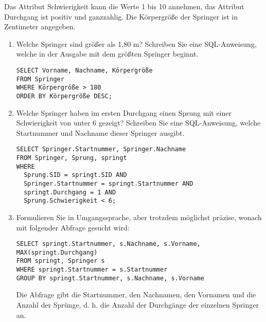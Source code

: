 \documentclass{bschlangaul-aufgabe}
\begin{document}
\noindent
Das Attribut Schwierigkeit kann die Werte 1 bis 10 annehmen, das
Attribut Durchgang ist positiv und ganzzahlig. Die Körpergröße der
Springer ist in Zentimeter angegeben.

\begin{enumerate}


\item Welche Springer sind größer als 1,80 m? Schreiben Sie eine
SQL-Anweisung, welche in der Ausgabe mit dem größten Springer beginnt.

\begin{liAntwort}
\begin{verbatim}
SELECT Vorname, Nachname, Körpergröße
FROM Springer
WHERE Körpergröße > 180
ORDER BY Körpergröße DESC;
\end{verbatim}
\end{liAntwort}


\item Welche Springer haben im ersten Durchgang einen Sprung mit einer
Schwierigkeit von unter 6 gezeigt? Schreiben Sie eine SQL-Anweisung,
welche Startnummer und Nachname dieser Springer ausgibt.

\begin{liAntwort}
\begin{verbatim}
SELECT Springer.Startnummer, Springer.Nachname
FROM Springer, Sprung, springt
WHERE
  Sprung.SID = springt.SID AND
  Springer.Startnummer = springt.Startnummer AND
  springt.Durchgang = 1 AND
  Sprung.Schwierigkeit < 6;
\end{verbatim}
\end{liAntwort}


\item Formulieren Sie in Umgangssprache, aber trotzdem möglichst
präzise, wonach mit folgender Abfrage gesucht wird:

\begin{verbatim}
SELECT springt.Startnummer, s.Nachname, s.Vorname, MAX(springt.Durchgang)
FROM springt, Springer s
WHERE springt.Startnummer = s.Startnummer
GROUP BY springt.Startnummer, s.Nachname, s.Vorname
\end{verbatim}

\begin{liAntwort}
Die Abfrage gibt die Startnummer, den Nachnamen, den Vornamen und
die Anzahl der Sprünge, d. h. die Anzahl der Durchgänge der
einzelnen Springer an.
\end{liAntwort}


\end{enumerate}
\end{document}
